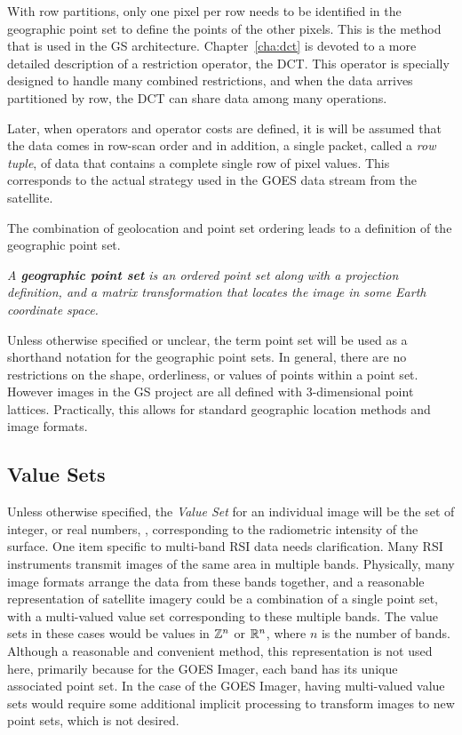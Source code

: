 \documentclass{ucdthesis}       %
\begin{document}
With row partitions, only one pixel per row needs to be identified in
the geographic point set to define the points of the other pixels.
This is the method that is used in the \ac{GS} architecture.
Chapter~\ref{cha:dct} is devoted to a more detailed description of a
restriction operator, the \acf{DCT}.  This operator is specially
designed to handle many combined restrictions, and when the data
arrives partitioned by row, the \acs{DCT} can share data among many
operations.

Later, when operators and operator costs are defined, it is will be
assumed that the data comes in row-scan order and in addition, a
single packet, called a \emph{row tuple}, of data that contains a
complete single row of pixel values.  This corresponds to the actual
strategy used in the \ac{GOES} data stream from the satellite.

The combination of geolocation and point set ordering leads to a
definition of the geographic point set.

\emph{A {\bf geographic point set} is an ordered point set along with
  a projection definition, and a matrix transformation that locates
  the image in some Earth coordinate space.}

Unless otherwise specified or unclear, the term point set will be used
as a shorthand notation for the geographic point sets.  In general,
there are no restrictions on the shape, orderliness, or values of
points within a point set.  However images in the \ac{GS} project are
all defined with 3-dimensional point lattices.  Practically, this
allows for standard geographic location methods and image formats.

\subsection{Value Sets}
\label{sec:values_sets}

Unless otherwise specified, the \emph{Value Set} for an individual
image will be the set of integer,  or real numbers, ,
corresponding to the radiometric intensity of the surface.  One item
specific to multi-band \ac{RSI} data needs clarification.  Many
\ac{RSI} instruments transmit images of the same area in multiple
bands.  Physically, many image formats arrange the data from these
bands together, and a reasonable representation of satellite imagery
could be a combination of a single point set, with a multi-valued
value set corresponding to these multiple bands.  The value sets in
these cases would be values in ${\mathbb{Z}}^n$ or ${\mathbb{R}}^n$, where $n$ is
the number of bands.  Although a reasonable and convenient method,
this representation is not used here, primarily because for the
\ac{GOES} Imager, each band has its unique associated point set.  In
the case of the \ac{GOES} Imager, having multi-valued value sets would
require some additional implicit processing to transform images to new
point sets, which is not desired.
\end{document}
